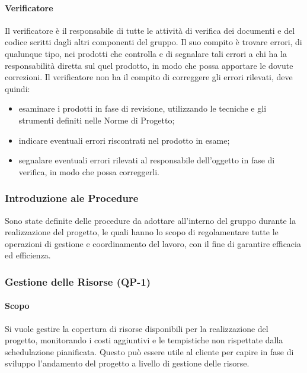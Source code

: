 		\paragraph{Verificatore}

			Il verificatore è il responsabile di tutte le attività di verifica dei documenti e del codice scritti dagli altri componenti del gruppo. Il suo compito è trovare errori, di qualunque tipo, nei prodotti che controlla e di segnalare tali errori a chi ha la responsabilità diretta sul quel prodotto, in modo che possa apportare le dovute correzioni.
			\newline
			Il verificatore non ha il compito di correggere gli errori rilevati, deve quindi:

			\begin{itemize}
				\item esaminare i prodotti in fase di revisione, utilizzando le tecniche e gli strumenti definiti nelle Norme di Progetto;
				\item indicare eventuali errori riscontrati nel prodotto in esame;
				\item segnalare eventuali errori rilevati al responsabile dell'oggetto in fase di verifica, in modo che possa correggerli.
			\end{itemize}

	\subsubsection{Introduzione ale Procedure}

		Sono state definite delle procedure da adottare all'interno del gruppo durante la realizzazione del progetto, le quali hanno lo scopo di regolamentare tutte le operazioni di gestione e coordinamento del lavoro, con il fine di garantire efficacia ed efficienza.


		\subsubsection{Gestione delle Risorse (QP-1)}

			\paragraph{Scopo}

				Si vuole gestire la copertura di risorse disponibili per la realizzazione del progetto, monitorando i costi aggiuntivi e le tempistiche non rispettate dalla schedulazione pianificata. Questo può essere utile al cliente per capire in fase di sviluppo l'andamento del progetto a livello di gestione delle risorse.

